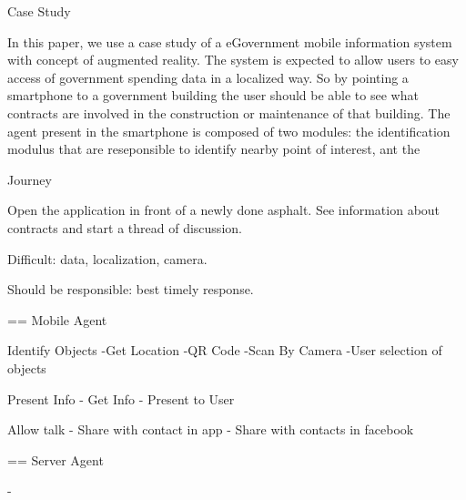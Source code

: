 Case Study

In this paper, we use a case study of a eGovernment mobile information system with concept of augmented reality. The system is expected to allow users to easy access of government spending data in a localized way.  So by pointing a smartphone to a government building the user should be able to see what contracts are involved in the construction or maintenance of that building.  The agent present in the smartphone is composed of two modules: the identification modulus that are reseponsible to identify nearby point of interest, ant the

Journey

Open the application in front of a newly done asphalt. See information about contracts and start a thread of discussion.

Difficult: data, localization, camera.

Should be responsible: best timely response.



== Mobile Agent

  Identify Objects
    -Get Location
    -QR Code
    -Scan By Camera
    -User selection of objects

  Present Info
    - Get Info
    - Present to User

  Allow talk
    - Share with contact in app
    - Share with contacts in facebook


== Server Agent

  -
